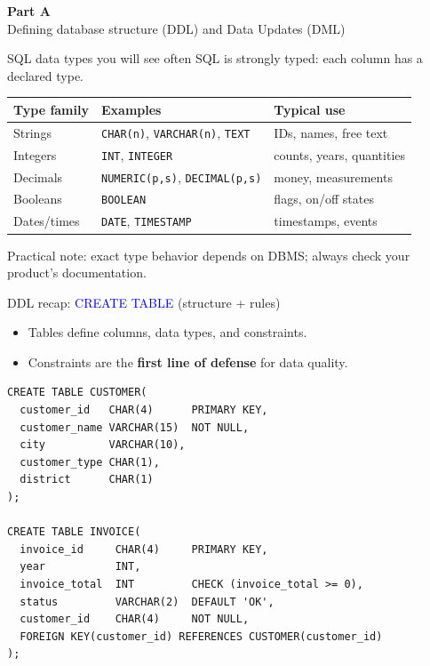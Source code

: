\documentclass[10pt,aspectratio=169]{beamer}
\newcommand{\sqlk}[1]{\textcolor{blue}{#1}}
\newcommand{\partslide}[2]{%
  \begin{frame}[plain]
    \vfill
    {\Huge\textbf{#1}}\\[0.6em]
    {\Large #2}
    \vfill
  \end{frame}
}
\begin{document}
\partslide{Part A}{Defining database structure (DDL) and Data Updates (DML)}

\begin{frame}{SQL data types you will see often}
\small
SQL is strongly typed: each column has a declared type.
\vspace{1mm}
\begin{center}
\begin{tabular}{@{}lll@{}}
\toprule
\textbf{Type family} & \textbf{Examples} & \textbf{Typical use}\\
\midrule
Strings & \texttt{CHAR(n)}, \texttt{VARCHAR(n)}, \texttt{TEXT} & IDs, names, free text\\
Integers & \texttt{INT}, \texttt{INTEGER} & counts, years, quantities\\
Decimals & \texttt{NUMERIC(p,s)}, \texttt{DECIMAL(p,s)} & money, measurements\\
Booleans & \texttt{BOOLEAN} & flags, on/off states\\
Dates/times & \texttt{DATE}, \texttt{TIMESTAMP} & timestamps, events\\
\bottomrule
\end{tabular}
\end{center}
\vspace{1mm}
\footnotesize Practical note: exact type behavior depends on DBMS; always check your product's documentation.
\end{frame}

\begin{frame}[fragile]{DDL recap: \sqlk{CREATE TABLE} (structure + rules)}
\small
\begin{itemize}
  \item Tables define columns, data types, and constraints.
  \item Constraints are the \textbf{first line of defense} for data quality.
\end{itemize}
\vspace{1mm}

\begin{lstlisting}[style=sqlite,basicstyle=\scriptsize\ttfamily]
CREATE TABLE CUSTOMER(
  customer_id   CHAR(4)      PRIMARY KEY,
  customer_name VARCHAR(15)  NOT NULL,
  city          VARCHAR(10),
  customer_type CHAR(1),
  district      CHAR(1)
);

CREATE TABLE INVOICE(
  invoice_id     CHAR(4)     PRIMARY KEY,
  year           INT,
  invoice_total  INT         CHECK (invoice_total >= 0),
  status         VARCHAR(2)  DEFAULT 'OK',
  customer_id    CHAR(4)     NOT NULL,
  FOREIGN KEY(customer_id) REFERENCES CUSTOMER(customer_id)
);
\end{lstlisting}
\end{frame}
\end{document}
